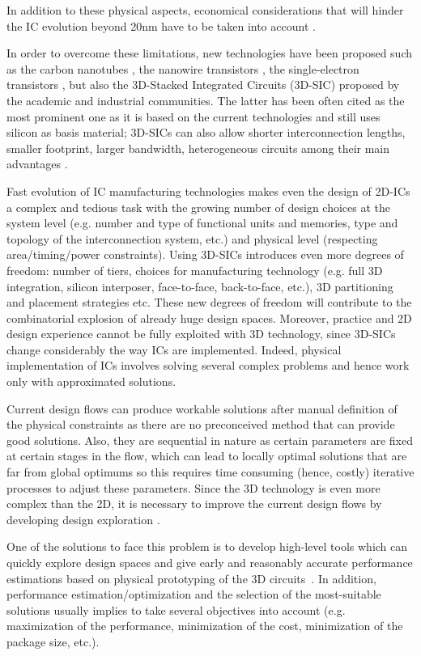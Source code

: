 In addition to these physical aspects, economical considerations that will hinder the IC evolution beyond 20nm have to be taken into account \cite{5227192,PFF10}.

In order to overcome these limitations, new technologies have been proposed such as the carbon nanotubes \cite{tans1998room}, the nanowire transistors \cite{doi:10.1021/nl025875l}, the single-electron transistors \cite{citeulike:4194929}, but also the 3D-Stacked Integrated Circuits (3D-SIC) proposed by the academic and industrial communities. The latter has been often cited as the most prominent one as it is based on the current technologies and still uses silicon as basis material; 3D-SICs can also allow shorter interconnection lengths, smaller footprint, larger bandwidth, heterogeneous circuits among their main advantages \cite{659500,1652906,981091,4299568}.

Fast evolution of IC manufacturing technologies makes even the design of 2D-ICs a complex and tedious task with the growing number of design choices at the system level (e.g. number and type of functional units and memories, type and topology of the interconnection system, etc.) and physical level (respecting area/timing/power constraints). Using 3D-SICs introduces even more degrees of freedom: number of tiers, choices for manufacturing technology (e.g. full 3D integration, silicon interposer, face-to-face, back-to-face, etc.), 3D partitioning and placement strategies etc. These new degrees of freedom will contribute to the combinatorial explosion of already huge design spaces. Moreover, practice and 2D design experience cannot be fully exploited with 3D technology, since 3D-SICs change considerably the way ICs are implemented. Indeed, physical implementation of ICs involves solving several complex problems and hence work only with approximated solutions.

Current design flows can produce workable solutions after manual definition of the physical constraints as there are no preconceived method that can provide good solutions. Also, they are sequential in nature as certain parameters are fixed at certain stages in the flow, which can lead to locally optimal solutions that are far from global optimums so this requires time consuming (hence, costly) iterative processes to adjust these parameters. Since the 3D technology is even more complex than the 2D, it is necessary to improve the current design flows by developing design exploration \cite{vanderbiest06, PFF10}.

One of the solutions to face this problem is to develop high-level tools which can quickly explore design spaces and give early and reasonably accurate performance estimations based on physical prototyping of the 3D circuits~\cite{PFF10}. In addition, performance estimation/optimization and the selection of the most-suitable solutions usually implies to take several objectives into account (e.g. maximization of the performance, minimization of the cost, minimization of the package size, etc.).

